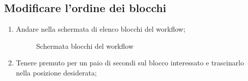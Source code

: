 \subsection{Modificare l'ordine dei blocchi}
\begin{enumerate}
	\item Andare nella schermata di elenco blocchi del workflow;
	\begin{figure}[!ht]
		\centering
		\caption{Schermata blocchi del workflow}
	\end{figure}
	\newpage
	\item Tenere premuto per un paio di secondi sul blocco interessato e trascinarlo nella posizione desiderata;

\end{enumerate}
